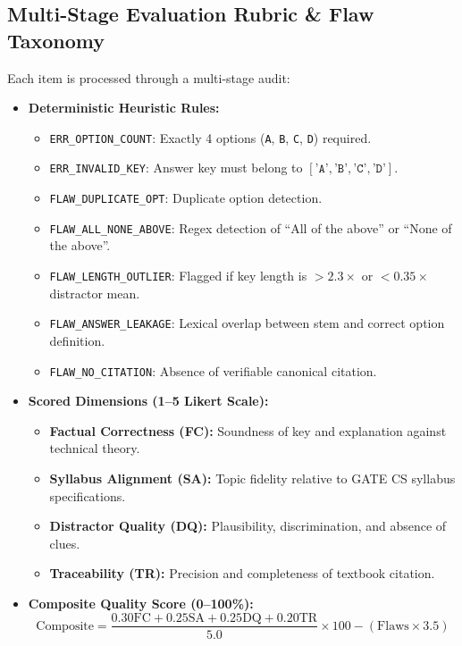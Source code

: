\documentclass[10pt,twocolumn,letterpaper]{article}
\begin{document}
\subsection{Multi-Stage Evaluation Rubric \& Flaw Taxonomy}
Each item is processed through a multi-stage audit:
\begin{itemize}
    \item \textbf{Deterministic Heuristic Rules:}
    \begin{itemize}
        \item \texttt{ERR\_OPTION\_COUNT}: Exactly 4 options (\texttt{A}, \texttt{B}, \texttt{C}, \texttt{D}) required.
        \item \texttt{ERR\_INVALID\_KEY}: Answer key must belong to $[\texttt{'A'}, \texttt{'B'}, \texttt{'C'}, \texttt{'D'}]$.
        \item \texttt{FLAW\_DUPLICATE\_OPT}: Duplicate option detection.
        \item \texttt{FLAW\_ALL\_NONE\_ABOVE}: Regex detection of ``All of the above'' or ``None of the above''.
        \item \texttt{FLAW\_LENGTH\_OUTLIER}: Flagged if key length is $> 2.3\times$ or $< 0.35\times$ distractor mean.
        \item \texttt{FLAW\_ANSWER\_LEAKAGE}: Lexical overlap between stem and correct option definition.
        \item \texttt{FLAW\_NO\_CITATION}: Absence of verifiable canonical citation.
    \end{itemize}
    \item \textbf{Scored Dimensions (1--5 Likert Scale):}
    \begin{itemize}
        \item \textbf{Factual Correctness (FC):} Soundness of key and explanation against technical theory.
        \item \textbf{Syllabus Alignment (SA):} Topic fidelity relative to GATE CS syllabus specifications.
        \item \textbf{Distractor Quality (DQ):} Plausibility, discrimination, and absence of clues.
        \item \textbf{Traceability (TR):} Precision and completeness of textbook citation.
    \end{itemize}
    \item \textbf{Composite Quality Score (0--100\%):}
    \begin{equation}
        \text{Composite} = \frac{0.30 \text{FC} + 0.25 \text{SA} + 0.25 \text{DQ} + 0.20 \text{TR}}{5.0} \times 100 - (\text{Flaws} \times 3.5)
    \end{equation}
\end{itemize}
\end{document}

